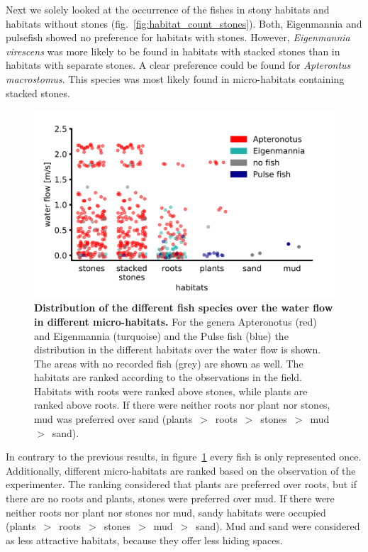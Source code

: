 Next we solely looked at the occurrence of the fishes in stony habitats and habitats without stones (fig.~\ref{fig:habitat_count_stones}). Both, Eigenmannia and pulsefish showed no preference for habitats with stones. However, \textit{Eigenmannia virescens} was more likely to be found in habitats with stacked stones than in habitats with separate stones. A clear preference could be found for \textit{Apterontus macrostomus}. This species was most likely found in micro-habitats containing stacked stones.

\begin{figure}[H]
    \centering
    \includegraphics[width =0.9 \textwidth]{pictures/Results/flow_habitat4.png}
    \caption{\textbf{Distribution of the different fish species over the water flow in different micro-habitats.} For the genera Apteronotus (red) and Eigenmannia (turquoise) and the Pulse fish (blue) the distribution in the different habitats over the water flow is shown. The areas with no recorded fish (grey) are shown as well. The habitats are ranked according to the observations in the field. Habitats with roots were ranked above stones, while plants are ranked above roots. If there were neither roots nor plant nor stones, mud was preferred over sand (plants~$>$~roots~$>$~stones~$>$~mud~$>$~sand).}
    \label{fig:habitat_vs_flow}
\end{figure}

In contrary to the previous results, in figure~\ref{fig:habitat_vs_flow} every fish is only represented once. Additionally, different micro-habitats are ranked based on the observation of the experimenter. The ranking considered that plants are preferred over roots, but if there are no roots and plants, stones were preferred over mud. If there were neither roots nor plant nor stones nor mud, sandy habitats were occupied (plants~$>$~roots~$>$~stones~$>$~mud~$>$~sand). Mud and sand were considered as less attractive habitats, because they offer less hiding spaces.\\

